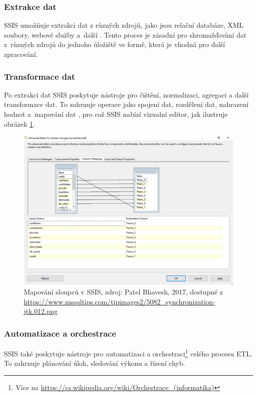 \subsubsection{Extrakce dat}
SSIS umožňuje extrakci dat z různých zdrojů, jako jsou relační databáze, XML soubory, webové služby a~další \cite{SQLServerDataSources:online}.
Tento proces je zásadní pro shromažďování dat z~různých zdrojů do jednoho úložiště ve formě, která je vhodná pro další zpracování.

\subsubsection{Transformace dat} Po extrakci dat SSIS poskytuje nástroje pro čištění, normalizaci, agregaci a další transformace dat. To zahrnuje operace jako spojení dat, rozdělení dat, nahrazení hodnot a~mapování dat \cite{SSISDataMapping:online}, pro což SSIS nabízí vizualní editor, jak ilustruje obrázek \ref{fig:SSISColumnMapping}.

\begin{figure}
    \centering
    \includegraphics[width=0.75\linewidth]{img/SSIS column mapping.png}
    \caption{Mapování sloupců v SSIS, zdroj: Patel Bhavesh, 2017, dostupné z \url{https://www.mssqltips.com/tipimages2/5082_synchronization-jtk.012.png}}
    \label{fig:SSISColumnMapping}
\end{figure}

\subsubsection{Automatizace a orchestrace} SSIS také poskytuje nástroje pro automatizaci a orchestraci\footnote{Více na \url{https://cs.wikipedia.org/wiki/Orchestrace_(informatika)}} celého procesu ETL. To zahrnuje plánování úloh, sledování výkonu a řízení chyb.

